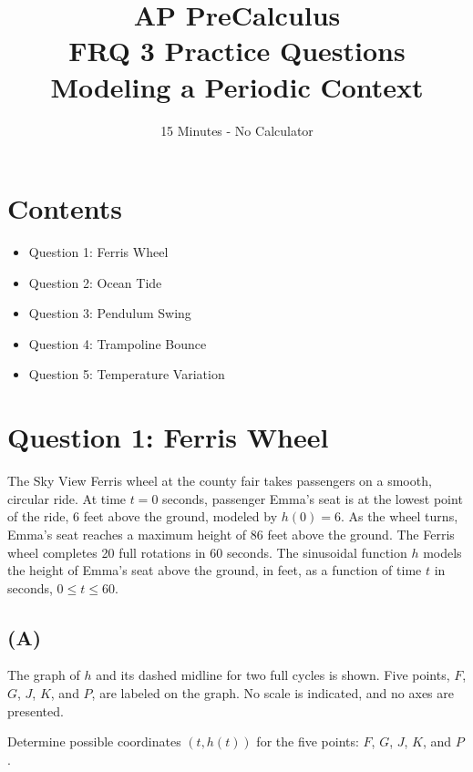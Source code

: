 \documentclass[11pt]{article}
\title{\textbf{AP PreCalculus}\\FRQ 3 Practice Questions\\Modeling a Periodic Context}
\author{15 Minutes - No Calculator}
\date{}
\begin{document}
\maketitle

\section*{Contents}
\begin{itemize}[noitemsep]
    \item Question 1: Ferris Wheel
    \item Question 2: Ocean Tide
    \item Question 3: Pendulum Swing
    \item Question 4: Trampoline Bounce
    \item Question 5: Temperature Variation
\end{itemize}

\newpage

\section*{Question 1: Ferris Wheel}

The Sky View Ferris wheel at the county fair takes passengers on a smooth, circular ride. At time $t = 0$ seconds, passenger Emma's seat is at the lowest point of the ride, 6 feet above the ground, modeled by $h(0) = 6$. As the wheel turns, Emma's seat reaches a maximum height of 86 feet above the ground. The Ferris wheel completes 20 full rotations in 60 seconds. The sinusoidal function $h$ models the height of Emma's seat above the ground, in feet, as a function of time $t$ in seconds, $0 \leq t \leq 60$.

\subsection*{(A)}
The graph of $h$ and its dashed midline for two full cycles is shown. Five points, $F$, $G$, $J$, $K$, and $P$, are labeled on the graph. No scale is indicated, and no axes are presented.

Determine possible coordinates $(t, h(t))$ for the five points: $F$, $G$, $J$, $K$, and $P$.
\end{document}
